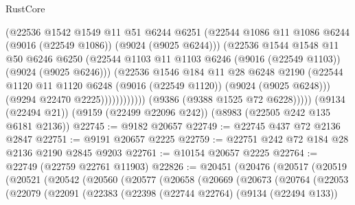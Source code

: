 \begin{lexlean}{RustCore}
\begin{coremodule}
                          (@22536
                            @1542
                            @1549
                            @11
                            @51
                            @6244
                            @6251
                            (@22544
                              @1086
                              @11
                              @1086
                              @6244
                              (@9016 (@22549 @1086))
                              (@9024 (@9025 @6244)))
                            (@22536
                              @1544
                              @1548
                              @11
                              @50
                              @6246
                              @6250
                              (@22544
                                @1103
                                @11
                                @1103
                                @6246
                                (@9016 (@22549 @1103))
                                (@9024 (@9025 @6246)))
                              (@22536
                                @1546
                                @184
                                @11
                                @28
                                @6248
                                @2190
                                (@22544
                                  @1120
                                  @11
                                  @1120
                                  @6248
                                  (@9016 (@22549 @1120))
                                  (@9024 (@9025 @6248)))
                                (@9294 @22470 @2225))))))))))))
          (@9386 (@9388 @1525 @72 @6228)))))
    (@9134 (@22494 @21))
    (@9159 (@22499 @22096 @242))
    (@8983 (@22505 @242 @135 @6181 @2136))
@22745 := @9182 @20657
@22749 := @22745 @437 @72 @2136 @2847
@22751 := @9191 @20657 @2225
@22759 := @22751 @242 @72 @184 @28 @2136 @2190 @2845 @9203
@22761 := @10154 @20657 @2225
@22764 := @22749 (@22759 @22761 @11903)
@22826 := @20451
    (@20476
      (@20517
        (@20519
          (@20521
            (@20542
              (@20560
                (@20577
                  (@20658
                    (@20669
                      (@20673
                        (@20764
                          (@22053
                            (@22079
                              (@22091
                                (@22383
                                  (@22398
                                    (@22744 @22764)
                                    (@9134 (@22494 @133))

\end{coremodule}
\end{lexlean}
